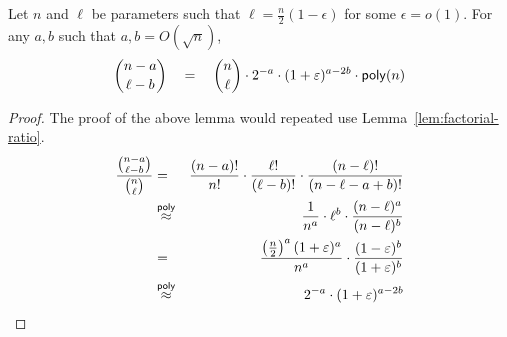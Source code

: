 \begin{lemma}\label{lem:binom-approx}
Let $n$ and $\ell$ be parameters such that $\ell = \frac{n}{2}(1 - \epsilon)$ for some $\epsilon = o(1)$. For any $a, b$ such that $a,b = O(\sqrt{n})$, 
\[
\binom{n - a}{\ell - b} \quad = \quad \binom{n}{\ell} \cdot 2^{-a} \cdot (1+\varepsilon)^{a-2b} \cdot \mathsf{poly}(n)
\]
\end{lemma}
\begin{proof}
The proof of the above lemma would repeated use Lemma~\ref{lem:factorial-ratio}. 
\begin{eqnarray*}
\frac{\binom{n-a}{\ell -b}}{\binom{n}{\ell}} & = & \frac{(n-a)!}{n!} \cdot \frac{\ell!}{(\ell -b)!}\cdot \frac{(n-\ell)!}{(n-\ell-a+b)!}\\
& \stackrel{\mathsf{poly}}{\approx}& \frac{1}{n^a} \cdot \ell^b \cdot \frac{(n-\ell)^a}{(n-\ell)^b}\\
& = & \frac{\left(\frac{n}{2}\right)^a(1 +\varepsilon)^a}{n^a} \cdot \frac{(1-\varepsilon)^{b}}{(1+\varepsilon)^b}\\
& \stackrel{\mathsf{poly}}{\approx} & 2^{-a} \cdot (1+\varepsilon)^{a - 2b}
\end{eqnarray*}
\end{proof}


